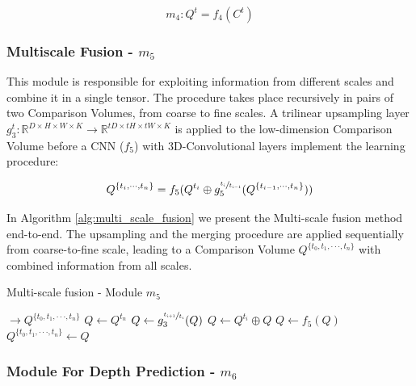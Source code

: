\documentclass[runningheads]{llncs}
\begin{document}
\begin{equation}
    m_4: Q^t = f_4(C^t)
\end{equation}


\subsubsection{Multiscale Fusion - $m_5$}

This module is responsible for exploiting information from different scales and combine it in a single tensor. The procedure takes place recursively in pairs of two Comparison Volumes, from coarse to fine scales. A trilinear upsampling layer $g_3^t: \mathbb{R}^{D \times H \times W \times K} \rightarrow \mathbb{R}^{tD \times tH \times tW \times K}$ is applied to the low-dimension Comparison Volume before a CNN ($f_5$) with 3D-Convolutional layers implement the learning procedure:

\begin{equation} \label{eq:two_scale_fusion}
Q^{ \{ t_i, \cdot \cdot \cdot, t_{n} \} } = f_5(Q^{t_i} \oplus g_5^{\sfrac{t_i}{t_{i-1}} }(Q^{ \{ t_{i-1}, \cdot \cdot \cdot, t_n \} }))
\end{equation}

In Algorithm \ref{alg:multi_scale_fusion} we present the Multi-scale fusion method end-to-end. The upsampling and the merging procedure are applied sequentially from coarse-to-fine scale, leading to a Comparison Volume $Q^{\{t_0, t_1, \cdot \cdot \cdot, t_n\}}$ with combined information from all scales.

\begin{algorithm}
\caption{Multi-scale fusion - Module $m_5$}\label{alg:multi_scale_fusion}
\begin{algorithmic}[1]
 $\rightarrow Q^{\{t_0, t_1, \cdot \cdot \cdot, t_n\}}$ 
\State $Q \gets Q^{t_n}$ 
\State $Q \gets g_3^{\sfrac{ t_{i+1} }{ t_i } }(Q)$ 
\State $Q \gets Q^{t_i} \oplus Q$ 
\State $Q \gets f_5(Q)$ 
\EndFor
\State \Return $Q^{\{t_0, t_1, \cdot \cdot \cdot, t_n\}} \gets Q$ 
\EndProcedure
\end{algorithmic}
\end{algorithm}


\subsubsection{Module For Depth Prediction - $m_6$}
\end{document}

